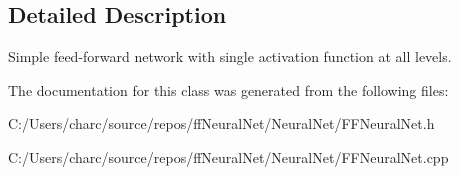 \subsection{Detailed Description}
Simple feed-\/forward network with single activation function at all levels. 

The documentation for this class was generated from the following files\+:\begin{DoxyCompactItemize}
\item 
C\+:/\+Users/charc/source/repos/ff\+Neural\+Net/\+Neural\+Net/F\+F\+Neural\+Net.\+h\item 
C\+:/\+Users/charc/source/repos/ff\+Neural\+Net/\+Neural\+Net/F\+F\+Neural\+Net.\+cpp\end{DoxyCompactItemize}

